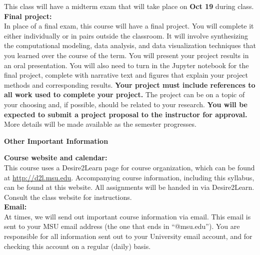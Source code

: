 \documentclass[oneside,letterpaper,11pt]{exam}
\begin{document}
{\noindent This class will have a midterm exam that will take place on \textbf{Oct 19} during class.}\\

{\noindent \textbf{Final project:}}\\[-5pt]

{\noindent In place of a final exam, this course will have a final project. You will complete it either individually or in pairs outside the classroom. It will involve synthesizing the computational modeling, data analysis, and data visualization techniques that you learned over the course of the term. You will present your project results in an oral presentation. You will also need to turn in the Jupyter notebook for the final project, complete with narrative text and figures that explain your project methods and corresponding results. \textbf{Your project must include references to all work used to complete your project.} The project can be on a topic of your choosing and, if possible, should be related to your research. \textbf{You will be expected to submit a project proposal to the instructor for approval.} More details will be made available as the semester progresses.}


\newpage

\begin{center}
	\vspace{5pt}
	\textbf{Other Important Information}
	\vspace{5pt}
\end{center}

{\noindent \textbf{Course website and calendar:}}\\[-5pt]

{\noindent This course uses a Desire2Learn page for course organization, which can be found at \url{http://d2l.msu.edu}. Accompanying course information, including this syllabus, can be found at this website. All assignments will be handed in via Desire2Learn. Consult the class website for instructions.}\\

{\noindent \textbf{Email:}}\\[-5pt]

{\noindent At times, we will send out important course information via email. This email is sent to your MSU email address (the one that ends in ``@msu.edu''). You are responsible for all information sent out to your University email account, and for checking this account on a regular (daily) basis.}\\
\end{document}
